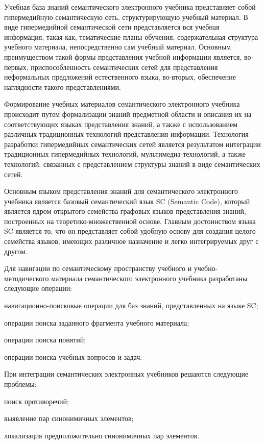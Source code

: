 Учебная база знаний семантического электронного учебника представляет собой гипермедийную семантическую сеть, структурирующую учебный материал. В виде гипермедийной семантической сети представляется вся учебная информация, такая как, тематические планы обучения, содержательная структура учебного материала, непосредственно сам учебный материал. Основным преимуществом такой формы представления учебной информации является, во-первых, приспособленность семантических сетей для представления неформальных предложений естественного языка, во-вторых, обеспечение наглядности такого представлениями.

Формирование учебных материалов семантического электронного учебника происходит путем формализации знаний предметной области и описания их на соответствующих языках представления знаний, а также с использованием различных традиционных технологий представления информации. Технология разработки гипермедийных семантических сетей является результатом интеграции традиционных гипермедийных технологий, мультимедиа-технологий, а также технологий, связанных с представлением структуры знаний в виде семантических сетей.

Основным языком представления знаний для семантического электронного учебника является базовый семантический язык SC (Semantic Code), который является ядром открытого семейства графовых языков представления знаний, построенных на теоретико-множественной основе. Главным достоинством языка SC является то, что он представляет собой удобную основу для создания целого семейства языков, имеющих различное назначение и легко интегрируемых друг с другом.

Для навигации по семантическому пространству учебного и учебно-методического материала семантического электронного учебника разработаны следующие операции:

\begin{textitemize}
	\item навигационно-поисковые операции для баз знаний, представленных на языке SC;
	\item операции поиска заданного фрагмента учебного материала;
	\item операции поиска понятий;
	\item операции поиска учебных вопросов и задач.
\end{textitemize}

При интеграции семантических электронных учебников решаются следующие проблемы:

\begin{textitemize}
	\item поиск противоречий;
	\item выявление пар синонимичных элементов;
	\item локализация предположительно синонимичных пар элементов.
\end{textitemize}

